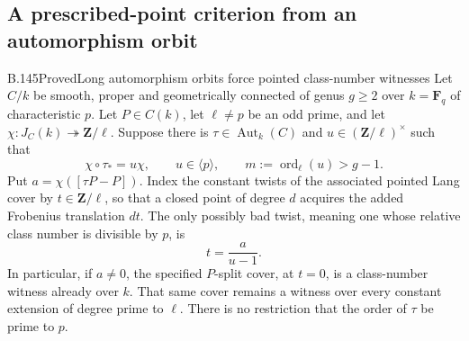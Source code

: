 \subsection{A prescribed-point criterion from an automorphism orbit}

\begin{claim}{B.145}{Proved}{Long automorphism orbits force pointed class-number witnesses}
Let $C/k$ be smooth, proper and geometrically connected of genus
$g\ge2$ over $k=\mathbf F_q$ of characteristic $p$.
Let $P\in C(k)$, let $\ell\ne p$ be an odd prime, and let
$\chi:J_C(k)\twoheadrightarrow\mathbf Z/\ell$.
Suppose there is $\tau\in\operatorname{Aut}_k(C)$ and
$u\in(\mathbf Z/\ell)^\times$ such that
\[
 \chi\circ\tau_*=u\chi,\qquad
 u\in\langle p\rangle,\qquad
 m:=\operatorname{ord}_{\ell}(u)>g-1 .
                                                            \tag{B.145.1}
\]
Put $a=\chi([\tau P-P])$.
Index the constant twists of the associated pointed Lang cover by
$t\in\mathbf Z/\ell$, so that a closed point of degree $d$
acquires the added Frobenius translation $dt$.
The only possibly bad twist, meaning one whose relative class
number is divisible by $p$, is
\[
                              t=\frac{a}{u-1}.
                                                            \tag{B.145.2}
\]
In particular, if $a\ne0$, the specified $P$-split cover, at
$t=0$, is a class-number witness already over $k$.
That same cover remains a witness over every constant extension
of degree prime to $\ell$.
There is no restriction that the order of $\tau$ be prime to $p$.


\end{claim}
